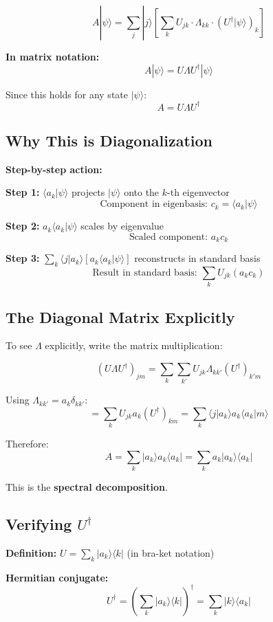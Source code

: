 \documentclass[11pt,a4paper]{article}
\begin{document}
$$A|\psi\rangle = \sum_j |j\rangle \left[\sum_k U_{jk} \cdot \Lambda_{kk} \cdot (U^\dagger|\psi\rangle)_k\right]$$

\textbf{In matrix notation:}
$$\boxed{A|\psi\rangle = U \Lambda U^\dagger |\psi\rangle}$$

Since this holds for any state $|\psi\rangle$:
$$\boxed{A = U \Lambda U^\dagger}$$

\subsection*{Why This is Diagonalization}

\textbf{Step-by-step action:}

\textbf{Step 1:} $\langle a_k|\psi\rangle$ projects $|\psi\rangle$ onto the $k$-th eigenvector
$$\text{Component in eigenbasis: } c_k = \langle a_k|\psi\rangle$$

\textbf{Step 2:} $a_k \langle a_k|\psi\rangle$ scales by eigenvalue
$$\text{Scaled component: } a_k c_k$$

\textbf{Step 3:} $\sum_k \langle j|a_k\rangle [a_k \langle a_k|\psi\rangle]$ reconstructs in standard basis
$$\text{Result in standard basis: } \sum_k U_{jk} (a_k c_k)$$

\subsection*{The Diagonal Matrix Explicitly}

To see $\Lambda$ explicitly, write the matrix multiplication:

$$(U \Lambda U^\dagger)_{jm} = \sum_k \sum_{k'} U_{jk} \Lambda_{kk'} (U^\dagger)_{k'm}$$

Using $\Lambda_{kk'} = a_k \delta_{kk'}$:
$$= \sum_k U_{jk} a_k (U^\dagger)_{km} = \sum_k \langle j|a_k\rangle a_k \langle a_k|m\rangle$$

Therefore:
$$A = \sum_k |a_k\rangle a_k \langle a_k| = \sum_k a_k |a_k\rangle\langle a_k|$$

This is the \textbf{spectral decomposition}.

\subsection*{Verifying $U^\dagger$}

\textbf{Definition:} $U = \sum_k |a_k\rangle\langle k|$ (in bra-ket notation)

\textbf{Hermitian conjugate:}
$$U^\dagger = \left(\sum_k |a_k\rangle\langle k|\right)^\dagger = \sum_k |k\rangle\langle a_k|$$
\end{document}
